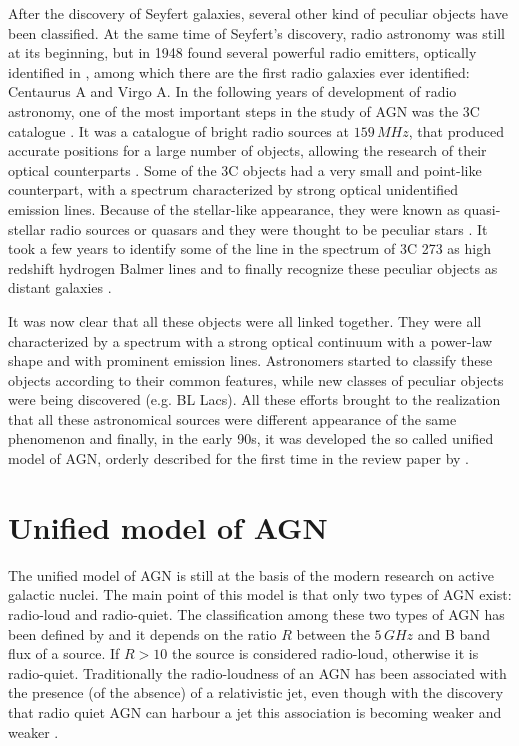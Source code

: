 \documentclass[../thesis.tex]{subfiles}
\begin{document}
After the discovery of Seyfert galaxies, several other kind of peculiar objects have been classified. 
At the same time of Seyfert's discovery, radio astronomy was still at its beginning, but in 1948 \citet{Bolton48} found several powerful radio emitters, optically identified in \citet{Bolton49}, among which there are the first radio galaxies ever identified: Centaurus A and Virgo A.
In the following years of development of radio astronomy, one of the most important steps in the study of AGN was the 3C catalogue \citep{Edge59}.
It was a catalogue of bright radio sources at $159\,\si{MHz}$, that produced accurate positions for a large number of objects, allowing the research of their optical counterparts \citep{Shields99}.
Some of the 3C objects had a very small and point-like counterpart, with a spectrum characterized by strong optical unidentified emission lines.
Because of the stellar-like appearance, they were known as quasi-stellar radio sources or quasars and they were thought to be peculiar stars \citep{Shields99}.
It took a few years to identify some of the line in the spectrum of 3C 273 as high redshift hydrogen Balmer lines and to finally recognize these peculiar objects as distant galaxies \citep{Schmidt63}.

It was now clear that all these objects were all linked together.
They were all characterized by a spectrum with a strong optical continuum with a power-law shape and with prominent emission lines.
Astronomers started to classify these objects according to their common features, while new classes of peculiar objects were being discovered (e.g. BL Lacs).
All these efforts brought to the realization that all these astronomical sources were different appearance of the same phenomenon and finally, in the early 90s, it was developed the so called unified model of AGN, orderly described for the first time in the review paper by \citet{Antonucci93}.


\section{Unified model of AGN}
\label{sec:unified_model}

The unified model of AGN \citep{Antonucci93} is still at the basis of the modern research on active galactic nuclei.
The main point of this model is that only two types of AGN exist: radio-loud and radio-quiet.
The classification among these two types of AGN has been defined by \citet{Kellermann89} and it depends on the ratio $R$ between the $5\,\si{GHz}$ and B band flux of a source.
If $R>10$ the source is considered radio-loud, otherwise it is radio-quiet.
Traditionally the radio-loudness of an AGN has been associated with the presence (of the absence) of a relativistic jet, even though with the discovery that radio quiet AGN can harbour a jet \citep[e.g.][]{Blundell03} this association is becoming weaker and weaker \citep{Padovani17,Foschini17}.
\end{document}
